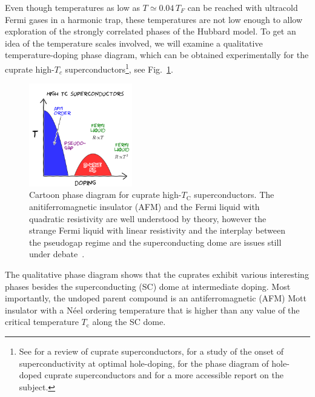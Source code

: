 \documentclass[oneside,11pt]{memoir}
\begin{document}
Even though temperatures as low as $T\simeq 0.04\,T_{F}$ can be reached with
ultracold Fermi gases in a harmonic trap, these temperatures are not low enough
to allow exploration of the strongly correlated phases of the Hubbard model.
To get an idea of the temperature scales involved, we will examine a
qualitative temperature-doping 
phase diagram, which can be obtained experimentally for the cuprate
high-$T_{c}$ superconductors\footnote{See \cite{Damascelli2003} for a review of
cuprate superconductors, \cite{He2011} for a study of the onset of
superconductivity at optimal hole-doping, \cite{Jin2011} for the phase diagram
of hole-doped cuprate superconductors and \cite{Grant2011} for a more
accessible report on the subject.}, see Fig.~\ref{fig:cartoon-phasediag}.
\begin{figure} \centering
\includegraphics[width=0.4\textwidth]{../figures/hubbard/highTc.png}
\caption[Cartoon phase diagram for cuprate high-$T_{\text{C}}$
superconductors.]{\small Cartoon phase diagram for cuprate high-$T_{\text{C}}$
superconductors. The anitiferromagnetic insulator (AFM) and the Fermi liquid
with quadratic resistivity are well understood by theory, however the strange
Fermi liquid with linear resistivity and the interplay between the pseudogap
regime and the superconducting dome are issues still under
debate~\cite{Grant2011}. }
\label{fig:cartoon-phasediag}
\end{figure}

The qualitative phase diagram shows that the cuprates exhibit various
interesting phases besides the superconducting (SC) dome at intermediate
doping.   Most importantly, the undoped parent compound is an antiferromagnetic
(AFM) Mott insulator with a N\'{e}el ordering temperature that is higher than
any value of the critical temperature $T_{\text{c}}$ along the SC dome.  
\end{document}
